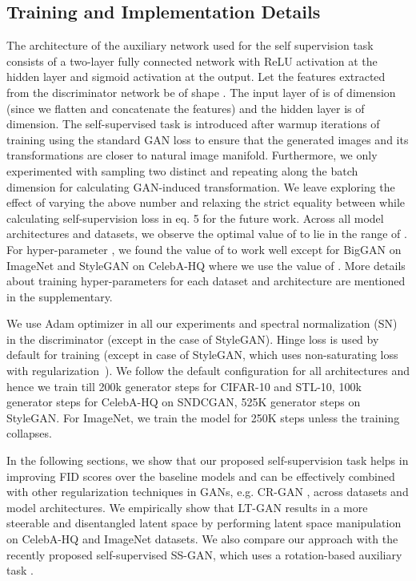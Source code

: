 \documentclass[10pt,twocolumn,letterpaper]{article}
\begin{document}
\subsection{Training and Implementation Details}
The architecture of the auxiliary network  used for the self supervision task consists of a two-layer fully connected network with ReLU activation at the hidden layer and sigmoid activation at the output. Let the features  extracted from the discriminator network be of shape . The input layer of  is of  dimension (since we flatten and concatenate the features) and the hidden layer is of  dimension. The self-supervised task is introduced after  warmup iterations of training using the standard GAN loss to ensure that the generated images and its transformations are closer to natural image manifold. Furthermore, we only experimented with sampling two distinct  and repeating along the batch dimension for calculating GAN-induced transformation. We leave exploring the effect of varying the above number and relaxing the strict equality between  while calculating self-supervision loss in eq. 5 for the future work. 
Across all model architectures and datasets, we observe the optimal value of  to lie in the range of . For hyper-parameter , we found the value of  to work well except for BigGAN on ImageNet and StyleGAN on CelebA-HQ where we use the value of . More details about training hyper-parameters for each dataset and architecture are mentioned in the supplementary. 
\par 

We use Adam optimizer in all our experiments and spectral normalization (SN)~\cite{sngan_proj} in the discriminator (except in the case of StyleGAN). Hinge loss is used by default for training (except in case of StyleGAN, which uses non-saturating loss with  regularization~\cite{R1_reg}). We follow the default configuration for all architectures and hence we train till 200k generator steps for CIFAR-10 and STL-10, 100k generator steps for CelebA-HQ on SNDCGAN, 525K generator steps on StyleGAN. For ImageNet, we train the model for 250K steps unless the training collapses. 


\par
In the following sections, we show that our proposed self-supervision task helps in improving FID scores over the baseline models and can be effectively combined with other regularization techniques in GANs, e.g. CR-GAN \cite{crgan2019chen}, across datasets and model architectures. We empirically show that LT-GAN results in a more steerable and disentangled latent space by performing latent space manipulation on CelebA-HQ and ImageNet datasets. We also compare our approach with the recently proposed self-supervised SS-GAN, which uses a rotation-based auxiliary task \cite{rot_ssgan2019chen}. 
\end{document}
